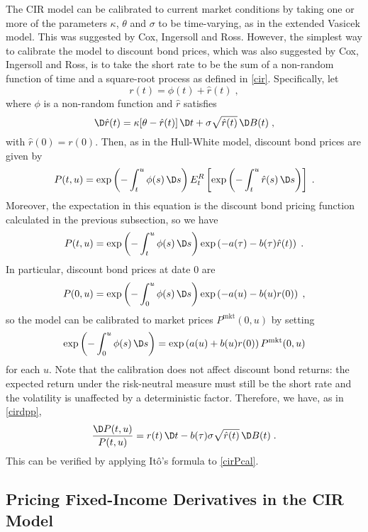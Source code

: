 The CIR model can be calibrated to current market conditions by taking one or more of the parameters $\kappa$, $\theta$ and $\sigma$ to be time-varying, as in the extended Vasicek model.  This was suggested by Cox, Ingersoll and Ross.  However, the simplest way to calibrate the model to discount bond prices, which was also suggested by Cox, Ingersoll and Ross, is to take the short rate to be the sum of a non-random function of time and a square-root process as defined in \eqref{cir}.  Specifically, let
$$r(t) = \phi(t) + \hat{r}(t)\; ,$$
where $\phi$ is a non-random function and $\hat{r}$ satisfies
\begin{equation}\label{cirrhat}
\D \hat{r}(t)=\kappa [\theta-\hat{r}(t)]\,\D t+\sigma \sqrt{\hat{r}(t)}\,\D B(t)\;,
\end{equation} 
with $\hat{r}(0) = r(0)$.
Then, as in the Hull-White model, discount bond prices are given by
$$P(t,u) = \exp\left(-\int_t^u \phi(s)\,\D s\right)E^R_t\left[\exp\left(-\int_t^u\hat{r}(s)\,\D s\right)\right]\; .$$
Moreover, the expectation in this equation is the discount bond pricing function calculated in the previous subsection, so we have
\begin{equation}\label{cirPcal}
P(t,u) = \exp\left(-\int_t^u \phi(s)\,\D s\right)\exp\left(-a(\tau)-b(\tau)\hat{r}(t)\right)\;.
\end{equation}
In particular, discount bond prices at date 0 are
$$P(0,u) = \exp\left(-\int_0^u \phi(s)\,\D s\right)\exp\left(-a(u)-b(u)r(0)\right)\; ,$$
so the model can be calibrated to market prices $P^{\text{mkt}}(0,u)$ by setting
\begin{equation}\label{circalibration}
\exp\left(-\int_0^u \phi(s)\,\D s\right) = \exp\left(a(u)+b(u)r(0)\right)P^{\text{mkt}}(0,u)
\end{equation}
for each $u$.
Note that the calibration does not affect discount bond returns: the expected return under the risk-neutral measure must still be the short rate and the volatility is unaffected by a deterministic factor.  Therefore, we have, as in  \eqref{cirdpp},
\begin{equation}\label{cirdpp2}
\frac{\D P(t,u)}{P(t,u)}  =   r(t)\,\D t - b(\tau)\sigma\sqrt{\hat{r}(t)}\,\D B(t)\;.
\end{equation}
This can be verified by applying It\^o's formula to  \eqref{cirPcal}.

\subsection*{Pricing Fixed-Income Derivatives in the CIR Model}

